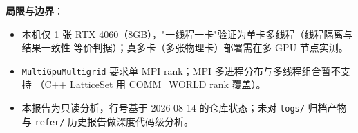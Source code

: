 \documentclass[UTF8]{ctexart}
\begin{document}
\textbf{局限与边界}：
\begin{itemize}
  \item 本机仅 1 张 RTX 4060（8GB），"一线程一卡"验证为单卡多线程（线程隔离与结果一致性
        等价判据）；真多卡（多张物理卡）部署需在多 GPU 节点实测。
  \item \texttt{MultiGpuMultigrid} 要求单 MPI rank；MPI 多进程分布与多线程组合暂不支持
        （C++ LatticeSet 用 COMM\_WORLD rank 覆盖）。
  \item 本报告为只读分析，行号基于 2026-08-14 的仓库状态；未对 \texttt{logs/} 归档产物
        与 \texttt{refer/} 历史报告做深度代码级分析。
\end{itemize}
\end{document}
